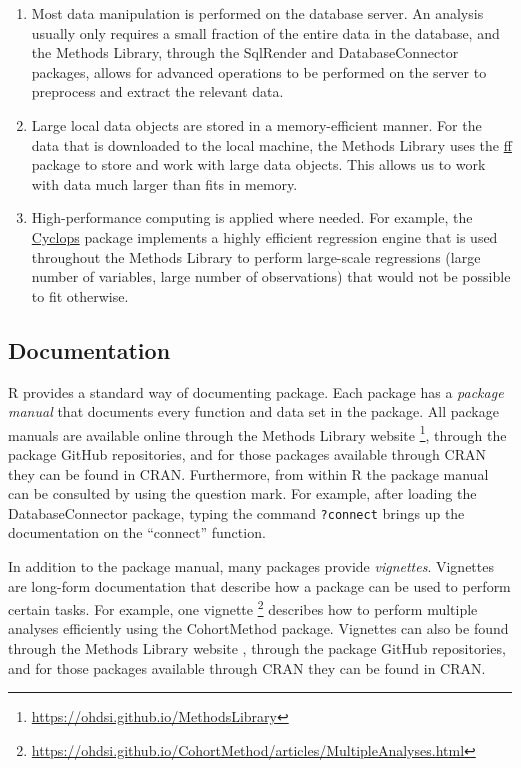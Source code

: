 \documentclass[11pt]{book}
\providecommand{\tightlist}{%
  \setlength{\itemsep}{0pt}\setlength{\parskip}{0pt}}
\let\rmarkdownfootnote\footnote%
\def\footnote{\protect\rmarkdownfootnote}
\theoremstyle{definition}
\theoremstyle{definition}
\theoremstyle{definition}
\theoremstyle{remark}
\begin{document}
\begin{enumerate}
\def\labelenumi{\arabic{enumi}.}
\tightlist
\item
  Most data manipulation is performed on the database server. An analysis usually only requires a small fraction of the entire data in the database, and the Methods Library, through the SqlRender and DatabaseConnector packages, allows for advanced operations to be performed on the server to preprocess and extract the relevant data.
\item
  Large local data objects are stored in a memory-efficient manner. For the data that is downloaded to the local machine, the Methods Library uses the \href{https://cran.r-project.org/web/packages/ff}{ff} package to store and work with large data objects. This allows us to work with data much larger than fits in memory.
\item
  High-performance computing is applied where needed. For example, the \href{https://ohdsi.github.io/Cyclops/}{Cyclops} package implements a highly efficient regression engine that is used throughout the Methods Library to perform large-scale regressions (large number of variables, large number of observations) that would not be possible to fit otherwise.
\end{enumerate}

\hypertarget{documentation-1}{%
\subsection{Documentation}\label{documentation-1}}

R provides a standard way of documenting package. Each package has a \emph{package manual} that documents every function and data set in the package. All package manuals are available online through the Methods Library website \footnote{\url{https://ohdsi.github.io/MethodsLibrary}}, through the package GitHub repositories, and for those packages available through CRAN they can be found in CRAN. Furthermore, from within R the package manual can be consulted by using the question mark. For example, after loading the DatabaseConnector package, typing the command \texttt{?connect} brings up the documentation on the ``connect'' function.

In addition to the package manual, many packages provide \emph{vignettes}. Vignettes are long-form documentation that describe how a package can be used to perform certain tasks. For example, one vignette \footnote{\url{https://ohdsi.github.io/CohortMethod/articles/MultipleAnalyses.html}} describes how to perform multiple analyses efficiently using the CohortMethod package. Vignettes can also be found through the Methods Library website , through the package GitHub repositories, and for those packages available through CRAN they can be found in CRAN. 
\end{document}
